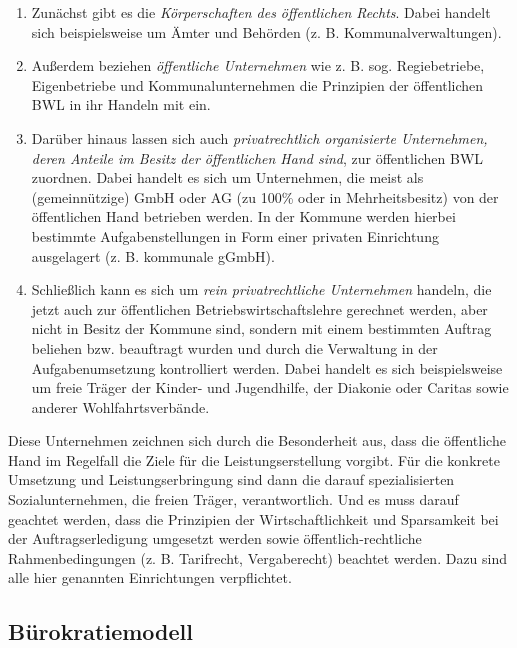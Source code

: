 \documentclass[
  letterpaper,
]{book}
\begin{document}
\begin{enumerate}
\def\labelenumi{\arabic{enumi}.}
\item
  Zunächst gibt es die \emph{Körperschaften des öffentlichen Rechts}.
  Dabei handelt sich beispielsweise um Ämter und Behörden (z. B.
  Kommunalverwaltungen).
\item
  Außerdem beziehen \emph{öffentliche Unternehmen} wie z. B. sog.
  Regiebetriebe, Eigenbetriebe und Kommunalunternehmen die Prinzipien
  der öffentlichen BWL in ihr Handeln mit ein.
\item
  Darüber hinaus lassen sich auch \emph{privatrechtlich organisierte
  Unternehmen, deren Anteile im Besitz der öffentlichen Hand sind}, zur
  öffentlichen BWL zuordnen. Dabei handelt es sich um Unternehmen, die
  meist als (gemeinnützige) GmbH oder AG (zu 100\% oder in
  Mehrheitsbesitz) von der öffentlichen Hand betrieben werden. In der
  Kommune werden hierbei bestimmte Aufgabenstellungen in Form einer
  privaten Einrichtung ausgelagert (z. B. kommunale gGmbH).
\item
  Schließlich kann es sich um \emph{rein privatrechtliche Unternehmen}
  handeln, die jetzt auch zur öffentlichen Betriebswirtschaftslehre
  gerechnet werden, aber nicht in Besitz der Kommune sind, sondern mit
  einem bestimmten Auftrag beliehen bzw. beauftragt wurden und durch die
  Verwaltung in der Aufgabenumsetzung kontrolliert werden. Dabei handelt
  es sich beispielsweise um freie Träger der Kinder- und Jugendhilfe,
  der Diakonie oder Caritas sowie anderer Wohlfahrtsverbände.
\end{enumerate}

Diese Unternehmen zeichnen sich durch die Besonderheit aus, dass die
öffentliche Hand im Regelfall die Ziele für die Leistungserstellung
vorgibt. Für die konkrete Umsetzung und Leistungserbringung sind dann
die darauf spezialisierten Sozialunternehmen, die freien Träger,
verantwortlich. Und es muss darauf geachtet werden, dass die Prinzipien
der Wirtschaftlichkeit und Sparsamkeit bei der Auftragserledigung
umgesetzt werden sowie öffentlich-rechtliche Rahmenbedingungen (z. B.
Tarifrecht, Vergaberecht) beachtet werden. Dazu sind alle hier genannten
Einrichtungen verpflichtet.

\subsection{Bürokratiemodell}\label{buerokratiemodell}
\end{document}
